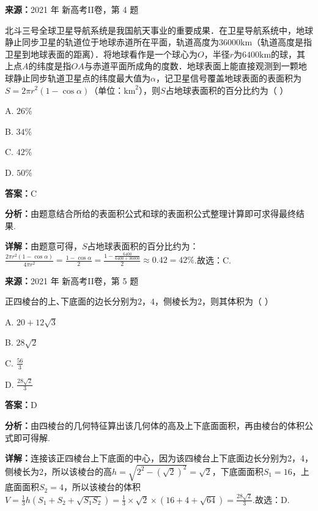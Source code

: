 \begin{question}[points=5]
\textbf{来源：}2021 年 新高考II卷，第 4 题\par
北斗三号全球卫星导航系统是我国航天事业的重要成果．在卫星导航系统中，地球静止同步卫星的轨道位于地球赤道所在平面，轨道高度为$36000\text{km}$（轨道高度是指卫星到地球表面的距离）．将地球看作是一个球心为$O$，半径$r$为$6400\text{km}$的球，其上点$A$的纬度是指$OA$与赤道平面所成角的度数．地球表面上能直接观测到一颗地球静止同步轨道卫星点的纬度最大值为$\alpha$，记卫星信号覆盖地球表面的表面积为$S=2\pi r^2(1-\cos\alpha)$（单位：$\text{km}^2$），则$S$占地球表面积的百分比约为（ ）
\begin{choices}
  \item A. $26\%$
  \item B. $34\%$
  \item C. $42\%$
  \item D. $50\%$
\end{choices}
\begin{solution}
\textbf{答案：}C

\textbf{分析：}由题意结合所给的表面积公式和球的表面积公式整理计算即可求得最终结果.

\textbf{详解：}由题意可得，$S$占地球表面积的百分比约为：$\frac{2\pi r^2(1-\cos\alpha)}{4\pi r^2}=\frac{1-\cos\alpha}{2}=\frac{1-\frac{6400}{6400+36000}}{2}\approx0.42=42\%$.故选：C.
\end{solution}
\end{question}

\begin{question}[points=5]
\textbf{来源：}2021 年 新高考II卷，第 5 题\par
正四棱台的上､下底面的边长分别为$2$，$4$，侧棱长为$2$，则其体积为（ ）
\begin{choices}
  \item A. $20+12\sqrt{3}$
  \item B. $28\sqrt{2}$
  \item C. $\frac{56}{3}$
  \item D. $\frac{28\sqrt{2}}{3}$
\end{choices}
\begin{solution}
\textbf{答案：}D

\textbf{分析：}由四棱台的几何特征算出该几何体的高及上下底面面积，再由棱台的体积公式即可得解.

\textbf{详解：}连接该正四棱台上下底面的中心，因为该四棱台上下底面边长分别为2，4，侧棱长为2，所以该棱台的高$h=\sqrt{2^2-(\sqrt{2})^2}=\sqrt{2}$，下底面面积$S_1=16$，上底面面积$S_2=4$，所以该棱台的体积$V=\frac{1}{3}h(S_1+S_2+\sqrt{S_1S_2})=\frac{1}{3}\times\sqrt{2}\times(16+4+\sqrt{64})=\frac{28\sqrt{2}}{3}$.故选：D.
\end{solution}
\end{question}

